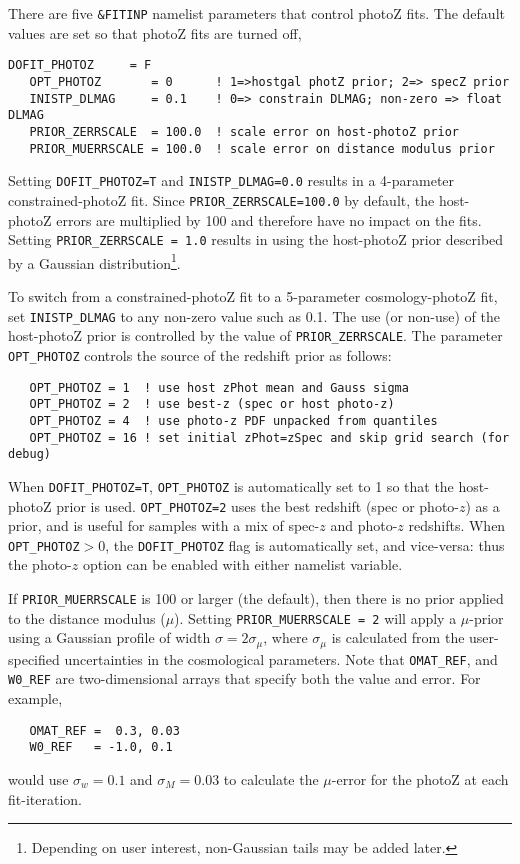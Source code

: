 \documentclass[12pt]{article}
\begin{document}
There are five {\tt \&FITINP} namelist parameters that
control photoZ fits. The default values are set so
that photoZ fits are turned off,
%
\begin{Verbatim}[frame=single]
   DOFIT_PHOTOZ     = F
   OPT_PHOTOZ       = 0      ! 1=>hostgal photZ prior; 2=> specZ prior
   INISTP_DLMAG     = 0.1    ! 0=> constrain DLMAG; non-zero => float DLMAG
   PRIOR_ZERRSCALE  = 100.0  ! scale error on host-photoZ prior
   PRIOR_MUERRSCALE = 100.0  ! scale error on distance modulus prior
\end{Verbatim}
%
Setting {\tt DOFIT\_PHOTOZ=T} and {\tt INISTP\_DLMAG=0.0}
results in a 4-parameter constrained-photoZ fit.
Since {\tt PRIOR\_ZERRSCALE=100.0} by default, the host-photoZ
errors are multiplied by 100 and therefore have no impact on the fits.
Setting {\tt PRIOR\_ZERRSCALE = 1.0} results in using the 
host-photoZ prior described by a Gaussian 
distribution\footnote{Depending on user interest, 
non-Gaussian tails may be added later.}.


To switch from a constrained-photoZ fit to a 5-parameter
cosmology-photoZ fit, set {\tt INISTP\_DLMAG} to any
non-zero value such as 0.1. The use (or non-use) of the
host-photoZ prior is controlled by the value of 
{\tt PRIOR\_ZERRSCALE}.
The parameter {\tt OPT\_PHOTOZ} controls the source of
the redshift prior as follows:
%
\begin{verbatim}
   OPT_PHOTOZ = 1  ! use host zPhot mean and Gauss sigma
   OPT_PHOTOZ = 2  ! use best-z (spec or host photo-z) 
   OPT_PHOTOZ = 4  ! use photo-z PDF unpacked from quantiles
   OPT_PHOTOZ = 16 ! set initial zPhot=zSpec and skip grid search (for debug)
\end{verbatim}
%
When {\tt DOFIT\_PHOTOZ=T}, 
{\tt OPT\_PHOTOZ} is automatically set to 1 so that the
host-photoZ prior is used.  
{\tt OPT\_PHOTOZ=2} uses the best redshift (spec or photo-$z$)
as a prior, and is useful for samples with a mix of spec-$z$ and 
photo-$z$ redshifts.
When {\tt OPT\_PHOTOZ$>0$}, the {\tt DOFIT\_PHOTOZ} flag is
automatically set, and vice-versa: thus the
photo-$z$ option can be enabled with either namelist variable.

If {\tt PRIOR\_MUERRSCALE} is 100 or larger (the default),
then there is no prior applied to the distance modulus ($\mu$).
Setting {\tt PRIOR\_MUERRSCALE = 2} will apply a $\mu$-prior
using a Gaussian profile of width $\sigma = 2\sigma_{\mu}$,
where $\sigma_{\mu}$ is calculated from the user-specified
uncertainties in the cosmological parameters.
Note that {\tt OMAT\_REF}, and {\tt W0\_REF} are two-dimensional
arrays that specify both the value and error. 
For example,
\begin{verbatim}
   OMAT_REF =  0.3, 0.03  
   W0_REF   = -1.0, 0.1
\end{verbatim}
% 
would use $\sigma_w=0.1$ and $\sigma_M=0.03$ to calculate
the $\mu$-error for the photoZ at each fit-iteration.
\end{document}
